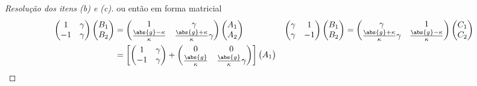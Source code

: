 \begin{proof}[Resolução dos itens (b) e (c)]
    ou então em forma matricial
    \begin{align*}
        \begin{pmatrix}
            1 & \gamma\\
            -1 & \gamma
        \end{pmatrix}
        \begin{pmatrix}
            B_1\\
            B_2
        \end{pmatrix} &=
        \begin{pmatrix}
            1 & \gamma\\
            \frac{\abs{g} - \kappa}{\kappa} & \frac{\abs{g} + \kappa}{\kappa}\gamma
        \end{pmatrix}
        \begin{pmatrix}
            A_1\\
            A_2
        \end{pmatrix}&
        \begin{pmatrix}
            \gamma & 1\\
            \gamma & -1
        \end{pmatrix}
        \begin{pmatrix}
            B_1\\
            B_2
        \end{pmatrix} &=
        \begin{pmatrix}
            \gamma & 1\\
            \frac{\abs{g} + \kappa}{\kappa}\gamma & \frac{\abs{g} - \kappa}{\kappa}
        \end{pmatrix}
        \begin{pmatrix}
            C_1\\
            C_2
        \end{pmatrix}\\
              &= \left[
                  \begin{pmatrix}
                      1 & \gamma\\
                      -1 & \gamma
                  \end{pmatrix}
                  +
                  \begin{pmatrix}
                      0 & 0\\
                      \frac{\abs{g}}{\kappa} & \frac{\abs{g}}{\kappa}\gamma
              \end{pmatrix}\right]
              \begin{pmatrix}
                  A_1\\

\end{pmatrix}
\end{align*}
\end{proof}
